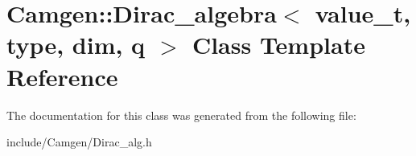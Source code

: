 \hypertarget{a00128}{\section{Camgen\-:\-:Dirac\-\_\-algebra$<$ value\-\_\-t, type, dim, q $>$ Class Template Reference}
\label{a00128}
}


The documentation for this class was generated from the following file\-:\begin{DoxyCompactItemize}
\item 
include/\-Camgen/Dirac\-\_\-alg.\-h\end{DoxyCompactItemize}
